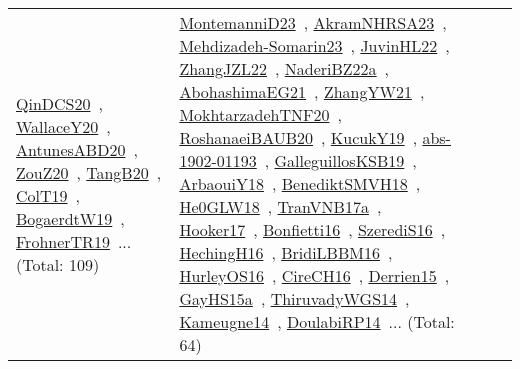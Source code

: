 {\begin{longtable}{lp{3cm}>{\raggedright\arraybackslash}p{6cm}>{\raggedright\arraybackslash}p{6cm}>{\raggedright\arraybackslash}p{8cm}}
\href{works/QinDCS20.pdf}{QinDCS20}~\cite{QinDCS20}, \href{works/WallaceY20.pdf}{WallaceY20}~\cite{WallaceY20}, \href{works/AntunesABD20.pdf}{AntunesABD20}~\cite{AntunesABD20}, \href{works/ZouZ20.pdf}{ZouZ20}~\cite{ZouZ20}, \href{works/TangB20.pdf}{TangB20}~\cite{TangB20}, \href{works/ColT19.pdf}{ColT19}~\cite{ColT19}, \href{works/BogaerdtW19.pdf}{BogaerdtW19}~\cite{BogaerdtW19}, \href{works/FrohnerTR19.pdf}{FrohnerTR19}~\cite{FrohnerTR19}... (Total: 109) & \href{works/MontemanniD23.pdf}{MontemanniD23}~\cite{MontemanniD23}, \href{works/AkramNHRSA23.pdf}{AkramNHRSA23}~\cite{AkramNHRSA23}, \href{works/Mehdizadeh-Somarin23.pdf}{Mehdizadeh-Somarin23}~\cite{Mehdizadeh-Somarin23}, \href{works/JuvinHL22.pdf}{JuvinHL22}~\cite{JuvinHL22}, \href{works/ZhangJZL22.pdf}{ZhangJZL22}~\cite{ZhangJZL22}, \href{works/NaderiBZ22a.pdf}{NaderiBZ22a}~\cite{NaderiBZ22a}, \href{works/AbohashimaEG21.pdf}{AbohashimaEG21}~\cite{AbohashimaEG21}, \href{works/ZhangYW21.pdf}{ZhangYW21}~\cite{ZhangYW21}, \href{works/MokhtarzadehTNF20.pdf}{MokhtarzadehTNF20}~\cite{MokhtarzadehTNF20}, \href{works/RoshanaeiBAUB20.pdf}{RoshanaeiBAUB20}~\cite{RoshanaeiBAUB20}, \href{works/KucukY19.pdf}{KucukY19}~\cite{KucukY19}, \href{works/abs-1902-01193.pdf}{abs-1902-01193}~\cite{abs-1902-01193}, \href{works/GalleguillosKSB19.pdf}{GalleguillosKSB19}~\cite{GalleguillosKSB19}, \href{works/ArbaouiY18.pdf}{ArbaouiY18}~\cite{ArbaouiY18}, \href{works/BenediktSMVH18.pdf}{BenediktSMVH18}~\cite{BenediktSMVH18}, \href{works/He0GLW18.pdf}{He0GLW18}~\cite{He0GLW18}, \href{works/TranVNB17a.pdf}{TranVNB17a}~\cite{TranVNB17a}, \href{works/Hooker17.pdf}{Hooker17}~\cite{Hooker17}, \href{works/Bonfietti16.pdf}{Bonfietti16}~\cite{Bonfietti16}, \href{works/SzerediS16.pdf}{SzerediS16}~\cite{SzerediS16}, \href{works/HechingH16.pdf}{HechingH16}~\cite{HechingH16}, \href{works/BridiLBBM16.pdf}{BridiLBBM16}~\cite{BridiLBBM16}, \href{works/HurleyOS16.pdf}{HurleyOS16}~\cite{HurleyOS16}, \href{works/CireCH16.pdf}{CireCH16}~\cite{CireCH16}, \href{works/Derrien15.pdf}{Derrien15}~\cite{Derrien15}, \href{works/GayHS15a.pdf}{GayHS15a}~\cite{GayHS15a}, \href{works/ThiruvadyWGS14.pdf}{ThiruvadyWGS14}~\cite{ThiruvadyWGS14}, \href{works/Kameugne14.pdf}{Kameugne14}~\cite{Kameugne14}, \href{works/DoulabiRP14.pdf}{DoulabiRP14}~\cite{DoulabiRP14}... (Total: 64)\\

\end{longtable}}
